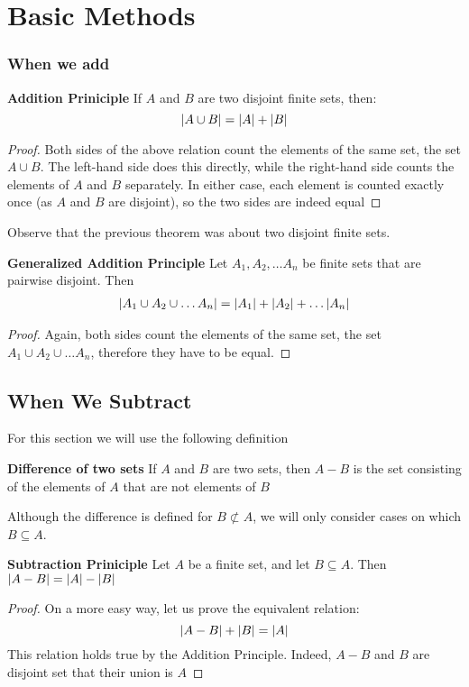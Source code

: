 \chapter{Basic Methods}
\subsection{When we add}
\begin{thm}
	\textbf{Addition Priniciple} If $A$ and $B$ are two disjoint finite sets, then:
	\[ \left|  A \cup B \right| = \left| A \right| + \left| B \right| \]
\end{thm}
\begin{proof}
	Both sides of the above relation count the elements of the same set, the set $ A \cup B$. The left-hand side does this directly, while the right-hand side counts the elements of $A$ and $B$ separately. In either case, each element is counted exactly once (as $A$ and $B$ are disjoint), so the two sides are indeed equal
\end{proof}
Observe that the previous theorem was about two disjoint finite sets.
\begin{thm}
	\textbf{Generalized Addition Principle} Let $ A_1, A_2, \ldots A_n$ be finite sets that are pairwise disjoint. Then
	\begin{align*}
	\left| A_1 \cup A_2 \cup \ldots A_n \right| = \left| A_1 \right| + \left| A_2 \right| + \ldots \left| A_n \right|
	\end{align*}
\end{thm}
\begin{proof}
	Again, both sides count the elements of the same set, the set $ A_1 \cup A_2 \cup \ldots A_n $, therefore they have to be equal.
\end{proof}
\section{When We Subtract}
For this section we will use the following definition
\begin{define}
	\textbf{Difference of two sets} If $A$ and $B$ are two sets, then $A - B$ is the set consisting of the elements of $A$ that are not elements of $B$
\end{define}
Although the difference is defined for $B \not \subset A$, we will only consider cases on which $ B \subseteq A$.
\begin{thm}
	\textbf{Subtraction Priniciple} Let $A$ be a finite set, and let $ B \subseteq A$. Then $ \left|  A - B \right| = \left| A \right| - \left| B \right|$
\end{thm}
\begin{proof}
	On a more easy way, let us prove the equivalent relation:
	\[ \left| A - B \right| + \left| B \right| = \left| A \right| \]
	This relation holds true by the Addition Principle. Indeed, $A - B$ and $B$ are disjoint set that their union is $A$
\end{proof}

